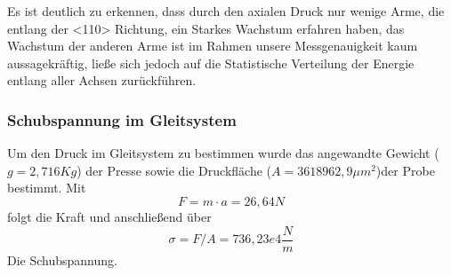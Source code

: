             Es ist deutlich zu erkennen, dass durch den axialen Druck nur wenige Arme, die entlang der <110> Richtung, ein Starkes Wachstum erfahren haben, das Wachstum der anderen Arme ist im Rahmen unsere
            Messgenauigkeit kaum aussagekräftig, ließe sich jedoch auf die Statistische Verteilung der Energie entlang aller Achsen zurückführen.
        \subsubsection*{Schubspannung im Gleitsystem}
            Um den Druck im Gleitsystem zu bestimmen wurde das angewandte Gewicht ($g = 2,716 Kg$) der Presse sowie die Druckfläche ($A=3618962,9 \mu m^2$)der Probe bestimmt.
            Mit
            \begin{equation}
                F = m \cdot a = 26,64 N
            \end{equation}
            folgt die Kraft und anschließend über
            \begin{equation}
                \sigma = F / A = 736,23e4 \frac{N}{m}
            \end{equation}
            Die Schubspannung.